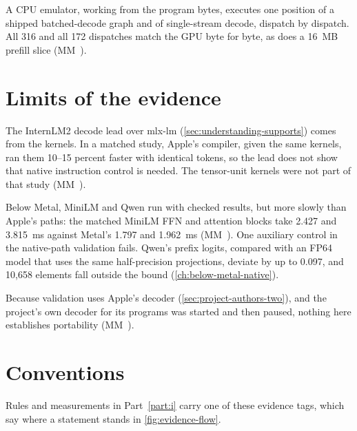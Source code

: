 A CPU emulator, working from the program bytes, executes one position of a shipped batched-decode graph and of
single-stream decode, dispatch by dispatch. All 316 and all 172 dispatches match the GPU byte for byte, as does a
16~MB prefill slice (MM~).

\section{Limits of the evidence}\label{sec:where-evidence-stops}

The InternLM2 decode lead over mlx-lm (\cref{sec:understanding-supports}) comes from the kernels. In a matched study,
Apple's compiler, given the same kernels, ran them 10–15 percent faster with identical tokens, so the lead does not show
that native instruction control is needed. The tensor-unit kernels were not part of that study (MM~).

Below Metal, MiniLM and Qwen run with checked results, but more slowly than Apple's paths: the matched MiniLM FFN and
attention blocks take 2.427 and 3.815~ms against Metal's 1.797 and 1.962~ms (MM~). One auxiliary control
in the native-path validation fails. Qwen's prefix logits, compared with an FP64 model that uses the same half-precision
projections, deviate by up to 0.097, and 10,658 elements fall outside the bound 
(\cref{ch:below-metal-native}).

Because validation uses Apple's decoder (\cref{sec:project-authors-two}), and the project's own decoder for its
programs was started and then paused, nothing here establishes portability (MM~).

\section{Conventions}\label{sec:read-this-document}

Rules and measurements in Part~\ref{part:i} carry one of these evidence tags, which say where a statement stands in
\cref{fig:evidence-flow}.



